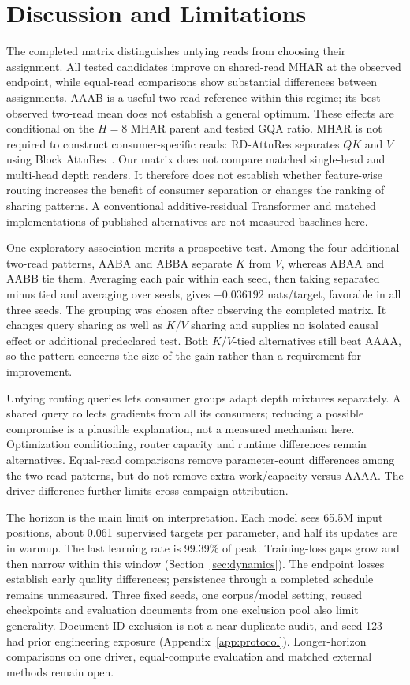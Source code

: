 \documentclass[11pt,letterpaper]{article}
\newcommand{\route}[1]{\textsf{#1}}
\newcommand{\KVGroupedMean}{-0.036192}
\newcommand{\LastLRPercent}{99.39}
\begin{document}
\section{Discussion and Limitations}
\label{sec:discussion}
The completed matrix distinguishes untying reads from choosing their
assignment. All tested candidates improve on shared-read MHAR at the observed
endpoint, while equal-read comparisons show substantial differences between
assignments. \route{AAAB} is a useful two-read reference within this regime;
its best observed two-read mean does not establish a general optimum.
These effects are conditional on the $H=8$ MHAR parent and tested GQA ratio.
MHAR is not required to construct consumer-specific reads: RD-AttnRes
separates $QK$ and $V$ using Block AttnRes~\cite{rd2026}. %
Our matrix does not compare matched single-head and multi-head depth readers.
It therefore does not establish whether feature-wise routing increases the
benefit of consumer separation or changes the ranking of sharing patterns.
A conventional additive-residual Transformer and matched implementations
of published alternatives are not measured baselines here.

One exploratory association merits a prospective test. Among the four
additional two-read patterns,
\route{AABA} and \route{ABBA} separate $K$ from $V$, whereas \route{ABAA}
and \route{AABB} tie them. Averaging each pair within each seed, then taking
separated minus tied and averaging over seeds, gives $\KVGroupedMean{}$
nats/target, favorable in all three seeds. The grouping was chosen after
observing the completed matrix. It changes query sharing as well as $K/V$
sharing and supplies no isolated causal effect or additional predeclared
test. Both $K/V$-tied alternatives still beat \route{AAAA}, so the pattern
concerns the size of the gain rather than a requirement for improvement.

Untying routing queries lets consumer groups adapt depth mixtures separately.
A shared query collects gradients from all its consumers; reducing a possible
compromise is a plausible explanation, not a measured mechanism here.
Optimization conditioning, router capacity and runtime differences remain
alternatives. Equal-read comparisons remove parameter-count differences among
the two-read patterns, but do not remove extra work/capacity versus \route{AAAA}.
The driver difference further limits cross-campaign attribution.

The horizon is the main limit on interpretation. Each model sees 65.5M input
positions, about 0.061 supervised targets per parameter, and half its updates
are in warmup. The last learning rate is \LastLRPercent{}\% of peak.
Training-loss gaps grow and then narrow within this window
(Section~\ref{sec:dynamics}). The endpoint losses establish early quality
differences; persistence through a completed schedule remains unmeasured.
Three fixed seeds, one corpus/model setting, reused checkpoints and evaluation
documents from one exclusion pool also limit generality. Document-ID
exclusion is not a near-duplicate audit, and seed 123 had prior engineering
exposure (Appendix~\ref{app:protocol}). Longer-horizon comparisons on one
driver, equal-compute evaluation and matched external methods remain open.
\end{document}
